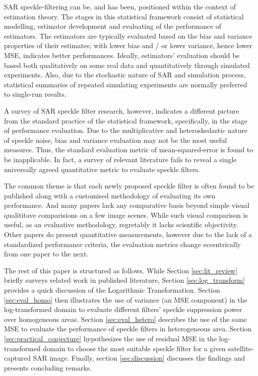 \documentclass[journal]{IEEEtran}
\begin{document}
SAR speckle-filtering can be, and has been, positioned within the context of estimation theory\cite{Touzi_2002_TGRS}. 
The stages in this statistical framework consist of statistical modelling, estimator development and evaluating of the performance of estimators. 
The estimators are typically evaluated based on the bias and variance properties of their estimates; 
	with lower bias and / or lower variance, hence lower MSE, indicates better performances. 
Ideally, estimators' evaluation should be based both qualitatively on some real data and quantitatively through simulated experiments. 
Also, due to the stochastic nature of SAR and simulation process, 
	statistical summaries of repeated simulating experiments are normally preferred to single-run results.

A survey of SAR speckle filter research, however, indicates 
	a different picture from the standard practice of the statistical framework, 
	specifically, in the stage of performance evaluation. 
Due to the multiplicative and heteroskedastic nature of speckle noise, 
	bias and variance evaluation may not be the most useful measures. 
Thus, the standard evaluation metric of mean-squared-error is found to be inapplicable.
In fact, a survey of relevant literature fails to reveal 
	a single universally agreed quantitative metric to evaluate speckle filters.

The common theme is that each newly proposed speckle filter is often found to be published along with a customised methodology of evaluating its own performance.
And many papers lack any comparative basis beyond simple visual qualititave comparisions on a few image scenes. 
While such visual comparison is useful, as an evaluative methodology, regretably it lacks scientific objectivity. 
Other papers do present quantitative measurements, 
	however  due to the lack of a standardized performance criteria, 
	the evaluation metrics change eccentrically from one paper to the next.

The rest of this paper is structured as follows.
While Section \ref{sec:lit_review} briefly surveys related work in published literature, Section \ref{sec:log_transform} provides a quick discussion of the Logarithmic Transformation.
Section \ref{sec:eval_homo} then illustrates the use of variance (an MSE component) in the log-transformed domain to evaluate different filters' speckle suppression power over homogeneous areas.
Section \ref{sec:eval_hetero} describes the use of the same MSE to evaluate the performance of speckle filters in heterogeneous area.
Section \ref{sec:practical_conjecture} hypothesizes the use of residual MSE in the log-transformed domain 
	to choose the most suitable speckle filter for a given satellite-captured SAR image.
Finally, section \ref{sec:discussion} discusses the findings and presents concluding remarks.
\end{document}
